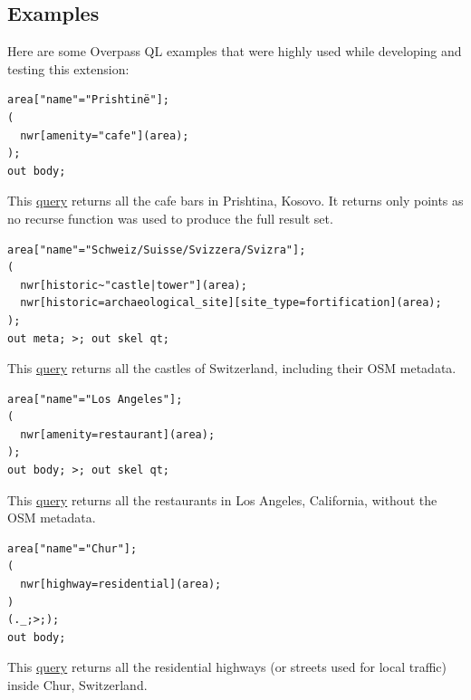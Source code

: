 \subsection{Examples}
Here are some Overpass QL examples that were highly used while developing and testing this extension:
\begin{verbatim}
area["name"="Prishtinë"];
(
  nwr[amenity="cafe"](area);
);
out body;
\end{verbatim}
This \href{https://overpass-turbo.eu/s/1bdv}{query} returns all the cafe bars in Prishtina, Kosovo.
It returns only points as no recurse function was used to produce the full result set.
\begin{verbatim}
area["name"="Schweiz/Suisse/Svizzera/Svizra"];
(
  nwr[historic~"castle|tower"](area);
  nwr[historic=archaeological_site][site_type=fortification](area);
);
out meta; >; out skel qt;
\end{verbatim}
This \href{https://overpass-turbo.eu/s/1aTT}{query} returns all the castles of Switzerland, including their OSM metadata.
\begin{verbatim}
area["name"="Los Angeles"];
(
  nwr[amenity=restaurant](area);
);
out body; >; out skel qt;
\end{verbatim}
This \href{https://overpass-turbo.eu/s/1aTR}{query} returns all the restaurants in Los Angeles, California, without the OSM metadata.
\begin{verbatim}
area["name"="Chur"];
(
  nwr[highway=residential](area);
)
(._;>;);
out body;
\end{verbatim}
This \href{https://overpass-turbo.eu/s/1aTV}{query} returns all the residential highways (or streets used for local traffic) inside Chur, Switzerland.